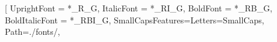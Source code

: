 \usepackage{ifxetex}
%
\usepackage{ifpdf} %
%
%
\usepackage[%
   centertags, %
   sumlimits,  %
   intlimits,  %
   namelimits, %
   fleqn,     %
]{amsmath} %
%
\usepackage{amsfonts}
\usepackage[fixamsmath,disallowspaces]{mathtools}
\usepackage{fixmath}
%
\def\UseLibertinusSTIXMix{true}
%
%
\makeatletter
\ifxetex %
	\usepackage{unicode-math}
	\ifdefined\UseLibertine
		\setmainfont[
								UprightFont = *_R_G,
								ItalicFont = *_RI_G,
								BoldFont = *_RB_G,
								BoldItalicFont = *_RBI_G,
								SmallCapsFeatures={Letters=SmallCaps},
								Path=./fonts/,
